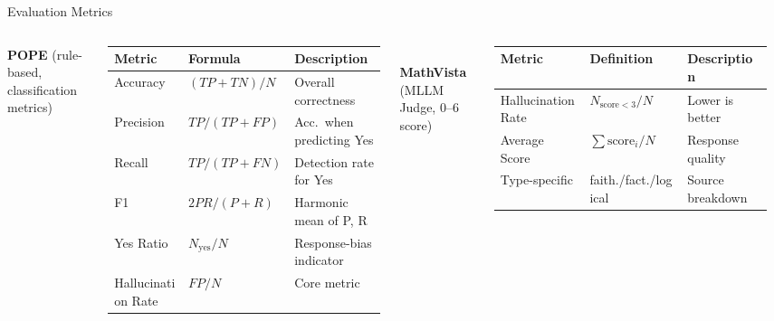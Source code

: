 \documentclass[9pt,aspectratio=169]{beamer}
\begin{document}
\begin{frame}{Evaluation Metrics}
  \begin{columns}[c,onlytextwidth]
      \renewcommand{\arraystretch}{0.9}
      \setlength{\tabcolsep}{3pt}

      \small\textbf{POPE} (rule-based, classification metrics)\\[0.1em]
      \footnotesize
      \begin{tabular}{lll}
        \toprule
        Metric & Formula & Description \\
        \midrule
        Accuracy           & $(TP+TN)/N$        & Overall correctness \\
        Precision          & $TP/(TP+FP)$       & Acc.\ when predicting Yes \\
        Recall             & $TP/(TP+FN)$       & Detection rate for Yes \\
        F1                 & $2PR/(P+R)$        & Harmonic mean of P, R \\
        Yes Ratio          & $N_{\text{yes}}/N$ & Response-bias indicator \\
        \rowcolor{pink!50}
        Hallucination Rate & $FP/N$             & Core metric \\
        \bottomrule
      \end{tabular}\\[0.5em]

      \small\textbf{MathVista} (MLLM Judge, 0--6 score)\\[0.1em]
      \footnotesize
      \begin{tabular}{lll}
        \toprule
        Metric & Definition & Description \\
        \midrule
        \rowcolor{pink!50}
        Hallucination Rate & $N_{\text{score}<3}/N$       & Lower is better \\
        Average Score      & $\sum \text{score}_i / N$    & Response quality \\
        Type-specific      & faith./fact./logical          & Source breakdown \\
        \bottomrule
      \end{tabular}\\[0.5em]


\end{columns}
\end{frame}
\end{document}
